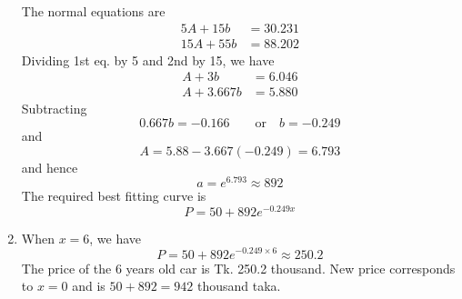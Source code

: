\documentclass[12pt,class=book,crop=false]{standalone}
\begin{document}
\begin{soln}
\begin{enumerate}[label=(\alph*)]
		      The normal equations are
		      \begin{align*}
			      5A+15b  & =30.231 \\
			      15A+55b & =88.202
		      \end{align*}
		      Dividing 1st eq. by 5 and 2nd by 15, we have
		      \begin{align*}
			      A+3b     & =6.046 \\
			      A+3.667b & =5.880
		      \end{align*}
		      Subtracting
		      \[
			      0.667b=-0.166 \qquad \text{or}\quad b=-0.249
		      \]
		      and
		      \[
			      A=5.88-3.667(-0.249)=6.793
		      \]
		      and hence
		      \[
			      a=e^6.793\approx 892
		      \]
		      The required best fitting curve is
		      \[
			      P=50+892e^{-0.249x}
		      \]
		\item When $ x = 6 $, we have
		      \[
			      P=50+892e^{-0.249\times 6}\approx 250.2
		      \]
		      The price of the 6 years old car is Tk. 250.2 thousand.
		      New price corresponds to $ x = 0 $ and is $ 50+892=942 $ thousand taka.
	\end{enumerate}
\end{soln}
\end{document}
